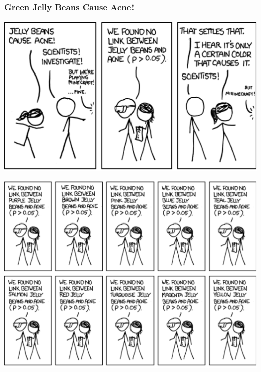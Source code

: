 \documentclass[handout]{beamer}
\begin{document}
\begin{frame}
\frametitle{Green Jelly Beans Cause Acne!}
\framesubtitle{\href{http://xkcd.com/882/}{}}
\begin{center}
	\includegraphics[scale=0.45]{./images/xkcd1}
\end{center}
\end{frame}
\begin{frame}
\begin{center}
	\includegraphics[scale=0.45]{./images/xkcd2}

\end{center}
\end{frame}
\end{document}
